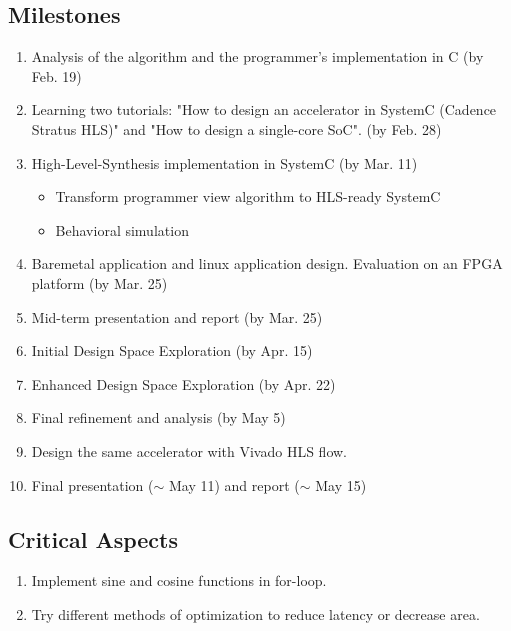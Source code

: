 \subsection{Milestones}\label{sec:arch}
\label{sec:milestones}

\vspace{-0.1in}
\begin{enumerate}
\setlength\itemsep{-0.15em}
  \item Analysis of the algorithm and the programmer's implementation in C (by Feb. 19)
  \item Learning two tutorials: "How to design an accelerator in SystemC (Cadence Stratus HLS)" and "How to design a single-core SoC"\cite{esp1}. (by Feb. 28)
  \item High-Level-Synthesis implementation in SystemC (by Mar. 11)
  \vspace{-2mm}
       \begin{itemize}
            \item Transform programmer view algorithm to HLS-ready SystemC
            \item Behavioral simulation
       \end{itemize}

  \item Baremetal application and linux application design. Evaluation on an FPGA platform (by Mar. 25)
  \item Mid-term presentation and report (by Mar. 25)
  \item Initial Design Space Exploration (by Apr. 15)
  \item Enhanced Design Space Exploration (by Apr. 22)
  \item Final refinement and analysis (by May 5)
  \item Design the same accelerator with Vivado HLS flow.
  \item Final presentation ($\sim$ May 11) and report ($\sim$ May 15)
\end{enumerate}

\subsection{Critical Aspects}
\begin{enumerate}
\setlength\itemsep{-0.15em}
\item Implement sine and cosine functions in for-loop.
\item Try different methods of optimization to reduce latency or decrease area.
\end{enumerate}

